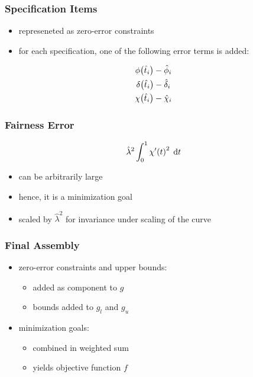 \documentclass{beamer}
\begin{document}
		\begin{frame}
			\frametitle{Specification Items}
			\begin{itemize}
				\item represeneted as zero-error constraints
				\item for each specification, one of the following error terms is added:
			\end{itemize}
			\begin{equation*}
				\begin{gathered}
					\phi\!\left( \hat{t}_i \right) - \hat{\phi}_i\\
					\delta\!\left( \hat{t}_i \right) - \hat{\delta}_i\\
					\chi\!\left( \hat{t}_i \right) - \hat{\chi}_i
				\end{gathered}
			\end{equation*}
		\end{frame}
		
		
		\begin{frame}
			\frametitle{Fairness Error}
			\begin{equation*}
				\hat{\lambda}^2\int_{0}^{1} \chi'\!\left( t \right)^2 \; \mathrm{d}t
			\end{equation*}
			\begin{itemize}
				\item can be arbitrarily large
				\item hence, it is a minimization goal
				\item scaled by \(\hat{\lambda}^2\) for invariance under scaling of the curve
			\end{itemize}
		\end{frame}
		
		\begin{frame}
			\frametitle{Final Assembly}
			\begin{itemize}
				\item zero-error constraints and upper bounds: 
				\begin{itemize}
					\item added as component to \(g\)
					\item bounds added to \(g_l\) and \(g_u\)
				\end{itemize}
				\item minimization goals: 
				\begin{itemize}
					\item combined in weighted sum
					\item yields objective function \(f\)
				\end{itemize}
			\end{itemize}
		\end{frame}
		
\end{document}
